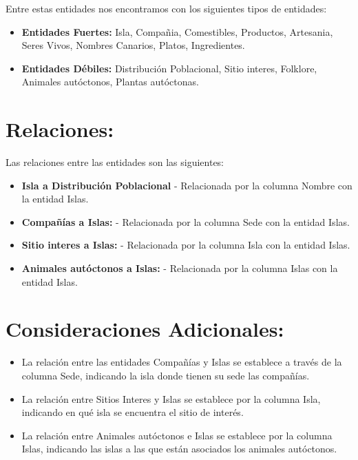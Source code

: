 \documentclass[11pt]{report}
\begin{document}
Entre estas entidades nos encontramos con los siguientes tipos de entidades:
\begin{itemize}
    \item \textbf{Entidades Fuertes:} Isla, Compañia, Comestibles, Productos, Artesania, Seres Vivos, Nombres Canarios, Platos, Ingredientes.
    \item \textbf{Entidades Débiles:} Distribución Poblacional, Sitio interes, Folklore, Animales autóctonos, Plantas autóctonas.
\end{itemize}

\section{Relaciones:}
Las relaciones entre las entidades son las siguientes:
\begin{itemize}
    \item \textbf{Isla a Distribución Poblacional}
    \subitem - Relacionada por la columna Nombre con la entidad Islas.
    
    \item \textbf{Compañías a Islas:}
    \subitem - Relacionada por la columna Sede con la entidad Islas.

    \item \textbf{Sitio interes a Islas:}
    \subitem - Relacionada por la columna Isla con la entidad Islas.

    \item \textbf{Animales autóctonos a Islas:}
    \subitem - Relacionada por la columna Islas con la entidad Islas.
\end{itemize}

\section{Consideraciones Adicionales:}

\begin{itemize}
    \item La relación entre las entidades Compañías y Islas se establece a través de la columna Sede, indicando la isla donde tienen su sede las compañías.
    \item La relación entre Sitios Interes y Islas se establece por la columna Isla, indicando en qué isla se encuentra el sitio de interés.
    \item La relación entre Animales autóctonos e Islas se establece por la columna Islas, indicando las islas a las que están asociados los animales autóctonos.
\end{itemize}
\end{document}
